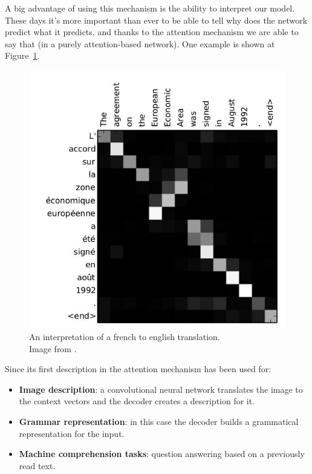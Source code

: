 A big advantage of using this mechanism is the ability to interpret our model. These days it's more important than ever to be able to tell why does the network predict what it predicts, and thanks to the attention mechanism we are able to say that (in a purely attention-based network). One example is shown at Figure~\ref{fig:interpretation}.

\begin{figure}[!htb]
	\centering
	\includegraphics[scale=0.4]{interpretation.jpg}
	\caption{An interpretation of a french to english translation.\\Image from \cite{Bahdanau:2015}.}
	\label{fig:interpretation}
\end{figure}

\begin{minipage}{\linewidth}
	Since its first description in \cite{Bahdanau:2015} the attention mechanism has been used for:
	\begin{itemize}
		\item \textbf{Image description}: a convolutional neural network translates the image to the context vectors and the decoder creates a description for it.
		\item \textbf{Grammar representation}: in this case the decoder builds a grammatical representation for the input.
		\item \textbf{Machine comprehension tasks}: question answering based on a previously read text. 
	\end{itemize}
\end{minipage}